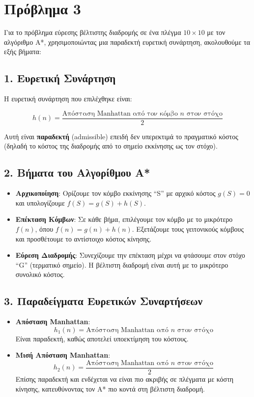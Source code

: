 \documentclass{article}
\begin{document}
\section*{Πρόβλημα 3}

Για το πρόβλημα εύρεσης βέλτιστης διαδρομής σε ένα πλέγμα \( 10 \times 10 \) με τον αλγόριθμο A*, χρησιμοποιώντας μια παραδεκτή ευρετική συνάρτηση, ακολουθούμε τα εξής βήματα:

\subsection*{1. Ευρετική Συνάρτηση}

Η ευρετική συνάρτηση που επιλέχθηκε είναι:

\[
h(n) = \frac{\text{Απόσταση Manhattan από τον κόμβο } n \text{ στον στόχο}}{2}
\]

Αυτή είναι \textbf{παραδεκτή} (admissible) επειδή δεν υπερεκτιμά το πραγματικό κόστος (δηλαδή το κόστος της διαδρομής από το σημείο εκκίνησης ως τον στόχο).

\subsection*{2. Βήματα του Αλγορίθμου A*}

\begin{itemize}
    \item \textbf{Αρχικοποίηση}: Ορίζουμε τον κόμβο εκκίνησης ``S'' με αρχικό κόστος \( g(S) = 0 \) και υπολογίζουμε \( f(S) = g(S) + h(S) \).
    \item \textbf{Επέκταση Κόμβων}: Σε κάθε βήμα, επιλέγουμε τον κόμβο με το μικρότερο \( f(n) \), όπου \( f(n) = g(n) + h(n) \). Εξετάζουμε τους γειτονικούς κόμβους και προσθέτουμε το αντίστοιχο κόστος κίνησης.
    \item \textbf{Εύρεση Διαδρομής}: Συνεχίζουμε την επέκταση μέχρι να φτάσουμε στον στόχο ``G'' (τερματικό σημείο). Η βέλτιστη διαδρομή είναι αυτή με το μικρότερο συνολικό κόστος.
\end{itemize}

\subsection*{3. Παραδείγματα Ευρετικών Συναρτήσεων}

\begin{itemize}
    \item \textbf{Απόσταση Manhattan}:
    \[
    h_1(n) = \text{Απόσταση Manhattan από } n \text{ στον στόχο}
    \]
    Είναι παραδεκτή, καθώς αποτελεί υποεκτίμηση του κόστους.
    \item \textbf{Μισή Απόσταση Manhattan}:
    \[
    h_2(n) = \frac{\text{Απόσταση Manhattan από } n \text{ στον στόχο}}{2}
    \]
    Επίσης παραδεκτή και ενδέχεται να είναι πιο ακριβής σε πλέγματα με κόστη κίνησης, κατευθύνοντας τον A* πιο κοντά στη βέλτιστη διαδρομή.
\end{itemize}
\end{document}
